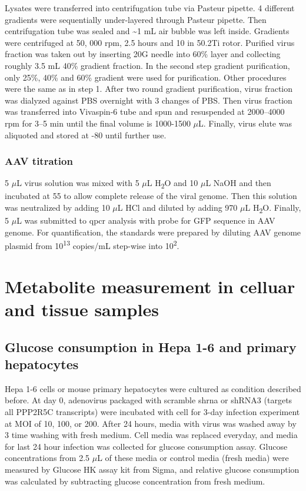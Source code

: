 Lysates were transferred into centrifugation tube via Pasteur pipette. 4 different gradients were sequentially under-layered through Pasteur pipette. Then centrifugation tube was sealed and \textasciitilde1 mL air bubble was left inside. Gradients were centrifuged at 50, 000 rpm, 2.5 hours and 10{\celsius} in 50.2Ti rotor. Purified virus fraction was taken out by inserting 20G needle into 60\% layer and collecting roughly 3.5 mL 40\% gradient fraction. In the second step gradient purification, only 25\%, 40\% and 60\% gradient were used for purification. Other procedures were the same as in step 1. After two round gradient purification, virus fraction was dialyzed against PBS overnight with 3 changes of PBS. Then virus fraction was transferred into Vivaspin-6 tube and spun and resuspended at 2000--4000 rpm for 3--5 min until the final volume is 1000-1500 $\mu$L. Finally, virus elute was aliquoted and stored at -80{\celsius} until further use.

\subsubsection{AAV titration}

5 $\mu$L virus solution was mixed with 5 $\mu$L H\textsubscript{2}O and 10 $\mu$L NaOH and then incubated at 55{\celsius} to allow complete release of the viral genome. Then this solution was neutralized by adding 10 $\mu$L HCl and diluted by adding 970 $\mu$L  H\textsubscript{2}O. Finally, 5 $\mu$L was submitted to \gls{qpcr} analysis with probe for GFP sequence in \gls{AAV} genome. For quantification, the standards were prepared by diluting \gls{AAV} genome plasmid from 10\textsuperscript{13} copies/mL step-wise into 10\textsuperscript2.

\section{Metabolite measurement in celluar and tissue samples}

\subsection{Glucose consumption in Hepa 1-6 and primary hepatocytes}

Hepa 1-6 cells or mouse primary hepatocytes were cultured as condition described before. At day 0, adenovirus packaged with scramble \gls{shrna} or shRNA3 (targets all PPP2R5C transcripts) were incubated with cell for 3-day infection experiment at MOI of 10, 100, or 200. After 24 hours, media with virus was washed away by 3 time washing with fresh medium. Cell media was replaced everyday, and media for last 24 hour infection was collected for glucose consumption assay. Glucose concentrations from 2.5 $\mu$L of these media or control media (fresh media) were measured by Glucose HK assay kit from Sigma, and relative glucose consumption was calculated by subtracting glucose concentration from fresh medium. 

